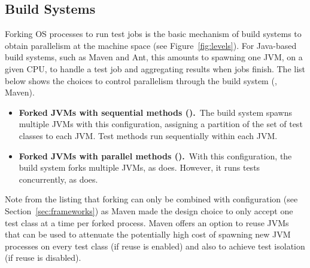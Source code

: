 \subsection{Build Systems}
\label{sec:builder}



Forking OS processes to run test jobs is the basic mechanism of build
systems to obtain parallelism at the machine space (see
Figure~\ref{fig:levels}).  For Java-based build systems, such as Maven
and Ant, this amounts to spawning one JVM, on a given CPU, to handle a
test job and aggregating results when jobs finish.  The list below
shows the choices to control parallelism through the build system
(\eg{}, Maven).

\begin{itemize}
\item
    \textbf{Forked JVMs with sequential methods (\ForkSeq).}~The build
    system spawns multiple JVMs with this configuration, assigning a
    partition of the set of test classes to each JVM.  Test methods
    run sequentially within each JVM.
\item
    \textbf{Forked JVMs with parallel methods (\ForkParMeth).}~With
    this configuration, the build system forks multiple JVMs, as
    \ForkSeq{} does.  However, it runs tests concurrently, as
    \SeqClassParMeth{} does.
\end{itemize}


Note from the listing that forking can only be combined with
configuration \SeqClassParMeth{} (see Section~\ref{sec:frameworks}) as
Maven made the design choice to only accept one test class at a time
per forked process.  Maven offers an option to reuse JVMs that can be
used to attenuate the potentially high cost of spawning new JVM
processes on every test class (if reuse is enabled) and also to
achieve test isolation (if reuse is disabled).



